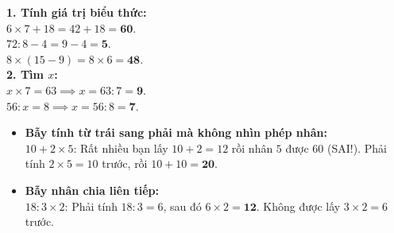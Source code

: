 \documentclass[12pt,a4paper]{article}
\begin{document}
\vspace{-2.5mm}
\noindent
\begin{minipage}[t]{0.49\textwidth}\vspace{0pt}
\begin{tcolorbox}[
  enhanced,
  colback=green!4!white,
  colframe=green!60!black,
  arc=2mm, boxrule=0.8pt,
  left=2mm, right=2mm, top=1.8mm, bottom=1.8mm,
  title={\footnotesize\bfseries\color{white}\faCheckCircle\ Ví dụ thực hành chuẩn mực}
]
{\footnotesize
\textbf{1. Tính giá trị biểu thức:}\\
$6 \times 7 + 18 = 42 + 18 = \mathbf{60}$.\\
$72 : 8 - 4 = 9 - 4 = \mathbf{5}$.\\
$8 \times (15 - 9) = 8 \times 6 = \mathbf{48}$.\\
\textbf{2. Tìm $x$:}\\
$x \times 7 = 63 \implies x = 63 : 7 = \mathbf{9}$.\\
$56 : x = 8 \implies x = 56 : 8 = \mathbf{7}$.
}
\end{tcolorbox}
\end{minipage}
\hfill
\begin{minipage}[t]{0.49\textwidth}\vspace{0pt}
\begin{tcolorbox}[
  enhanced,
  colback=red!4!white,
  colframe=red!70!black,
  arc=2mm, boxrule=0.8pt,
  left=2mm, right=2mm, top=1.8mm, bottom=1.8mm,
  title={\footnotesize\bfseries\color{white}\faExclamationTriangle\ Mẹo tránh bẫy trắc nghiệm}
]
{\footnotesize
\begin{itemize}\setlength{\itemsep}{1.5pt}\setlength{\leftskip}{-2.5mm}
  \item \textbf{Bẫy tính từ trái sang phải mà không nhìn phép nhân:}\\
  $10 + 2 \times 5$: Rất nhiều bạn lấy $10 + 2 = 12$ rồi nhân $5$ được $60$ (SAI!). Phải tính $2 \times 5 = 10$ trước, rồi $10 + 10 = \mathbf{20}$.
  \item \textbf{Bẫy nhân chia liên tiếp:}\\
  $18 : 3 \times 2$: Phải tính $18 : 3 = 6$, sau đó $6 \times 2 = \mathbf{12}$. Không được lấy $3 \times 2 = 6$ trước.
\end{itemize}
}
\end{tcolorbox}
\end{minipage}
\end{document}

